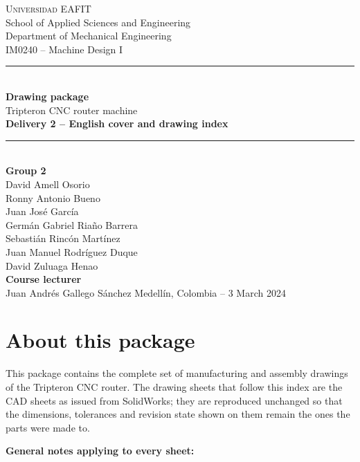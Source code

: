 \documentclass[11pt]{article}
\begin{document}
\thispagestyle{empty}
\begin{center}
\vspace*{1cm}
{\Large\scshape Universidad EAFIT}\\[3pt]
{\large School of Applied Sciences and Engineering}\\[3pt]
{\large Department of Mechanical Engineering}\\[3pt]
{\large IM0240 -- Machine Design I}\\[1.8cm]

{\color{eafitblue}\rule{\textwidth}{1.4pt}}\\[12pt]
{\huge\bfseries Drawing package}\\[8pt]
{\LARGE Tripteron CNC router machine}\\[10pt]
{\large\bfseries Delivery 2 -- English cover and drawing index}\\[8pt]
{\color{eafitblue}\rule{\textwidth}{1.4pt}}\\[2cm]

{\large\bfseries Group 2}\\[8pt]
{\large David Amell Osorio}\\[4pt]
{\large Ronny Antonio Bueno}\\[4pt]
{\large Juan Jos\'e Garc\'ia}\\[4pt]
{\large Germ\'an Gabriel Ria\~no Barrera}\\[4pt]
{\large Sebasti\'an Rinc\'on Mart\'inez}\\[4pt]
{\large Juan Manuel Rodr\'iguez Duque}\\[4pt]
{\large David Zuluaga Henao}\\[1.4cm]

{\large\bfseries Course lecturer}\\[8pt]
{\large Juan Andr\'es Gallego S\'anchez}
\vfill
{\large Medell\'in, Colombia -- 3 March 2024}
\end{center}

\clearpage
\section{About this package}

This package contains the complete set of manufacturing and assembly drawings of the
Tripteron CNC router. The drawing sheets that follow this index are the CAD sheets as
issued from SolidWorks; they are reproduced unchanged so that the dimensions, tolerances
and revision state shown on them remain the ones the parts were made to.

\textbf{General notes applying to every sheet:}
\end{document}
